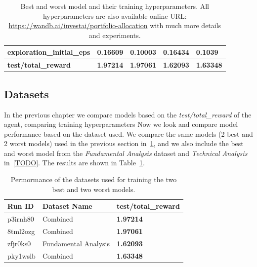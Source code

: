 \documentclass[../xlapes02]{subfiles}
\begin{document}
\begin{table}[!ht]
\begin{tabular}{|l||l|l||l|l|}
            \textbf{exploration\_initial\_eps} & 0.16609                                      & 0.10003                                      & 0.16434                                      & 0.1039                                       \\ \hline
            \textbf{test/total\_reward}        & \textcolor[RGB]{50,150,50}{\textbf{1.97214}} & \textcolor[RGB]{50,150,50}{\textbf{1.97061}} & \textcolor[RGB]{150,50,50}{\textbf{1.62093}} & \textcolor[RGB]{150,50,50}{\textbf{1.63348}} \\ \hline
        \end{tabular}
        \caption{Best and worst model and their training hyperparameters. All hyperparameters are also available online URL: \url{https://wandb.ai/investai/portfolio-allocation} with much more details and experiments.}
    \end{table}

    \subsection{Datasets}\label{subsec:datasets}
    In the previous chapter we compare models based on the \emph{test/total\_reward} of the agent, comparing training hyperparameters Now we look and compare model performance based on the dataset used. We compare the same models (2 best and 2 worst models) used in the previous section in~\cref{tab:best-worst-datasets}, and we also include the best and worst model from the \emph{Fundamental Analysis} dataset and \emph{Technical Analysis} in~\cref{TODO}. The results are shown in Table~\ref{tab:best-worst-datasets}.
    \begin{table}[!ht]
        \centering
        \label{tab:best-worst-datasets}
        \begin{tabular}{|l|l|l|}
            \hline
            \textbf{Run ID} & \textbf{Dataset Name} & \textbf{test/total\_reward}                  \\ \hline
            p3irnh80        & Combined              & \textcolor[RGB]{50,150,50}{\textbf{1.97214}} \\ \hline
            8tml2ozg        & Combined              & \textcolor[RGB]{50,150,50}{\textbf{1.97061}} \\ \hline
            zfjr0ks0        & Fundamental Analysis  & \textcolor[RGB]{150,50,50}{\textbf{1.62093}} \\ \hline
            pky1wslb        & Combined              & \textcolor[RGB]{150,50,50}{\textbf{1.63348}} \\ \hline
        \end{tabular}
        \caption{Permormance of the datasets used for training the two best and two worst models.}
    \end{table}
\end{document}
